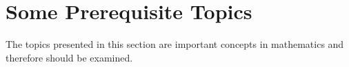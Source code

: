 \appendix

\chapter{Some Prerequisite Topics}

The topics presented in this section are important concepts in mathematics and therefore should be
examined.
